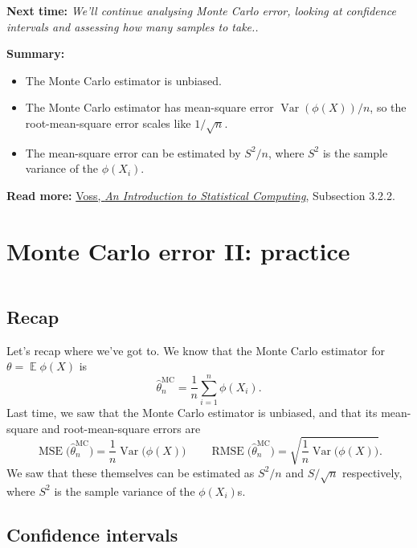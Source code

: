 \documentclass[
  letterpaper,
  DIV=11,
  numbers=noendperiod]{scrreprt}
\newcommand{\Exg}{\operatorname{\mathbb{E}}}
\newcommand{\Var}{\operatorname{Var}}
\theoremstyle{plain}
\theoremstyle{definition}
\theoremstyle{definition}
\theoremstyle{remark}
\begin{document}
\textbf{Next time:} \emph{We'll continue analysing Monte Carlo error,
looking at confidence intervals and assessing how many samples to
take..}

\textbf{Summary:}

\begin{itemize}
\item
  The Monte Carlo estimator is unbiased.
\item
  The Monte Carlo estimator has mean-square error \(\Var(\phi(X))/n\),
  so the root-mean-square error scales like \(1/\sqrt{n}\).
\item
  The mean-square error can be estimated by \(S^2 / n\), where \(S^2\)
  is the sample variance of the \(\phi(X_i)\).
\end{itemize}

\textbf{Read more:}
\href{https://leeds.primo.exlibrisgroup.com/permalink/44LEE_INST/1fj430b/cdi_askewsholts_vlebooks_9781118728031}{Voss,
\emph{An Introduction to Statistical Computing}}, Subsection 3.2.2.

\chapter{Monte Carlo error II:
practice}\label{monte-carlo-error-ii-practice}

\[ \]

\section{Recap}\label{recap}

Let's recap where we've got to. We know that the Monte Carlo estimator
for \(\theta = \Exg \phi(X)\) is
\[ \widehat{\theta}_n^{\mathrm{MC}} = \frac{1}{n} \sum_{i=1}^n \phi(X_i) .\]
Last time, we saw that the Monte Carlo estimator is unbiased, and that
its mean-square and root-mean-square errors are
\[ \operatorname{MSE}\big(\widehat{\theta}_n^{\mathrm{MC}}\big) = \frac{1}{n} \operatorname{Var}\big(\phi(X)\big) \qquad \operatorname{RMSE}\big(\widehat{\theta}_n^{\mathrm{MC}}\big) = \sqrt{\frac{1}{n} \operatorname{Var}\big(\phi(X)\big)} . \]
We saw that these themselves can be estimated as \(S^2/n\) and
\(S/\sqrt{n}\) respectively, where \(S^2\) is the sample variance of the
\(\phi(X_i)\)s.

\section{Confidence intervals}\label{confidence-intervals}
\end{document}
